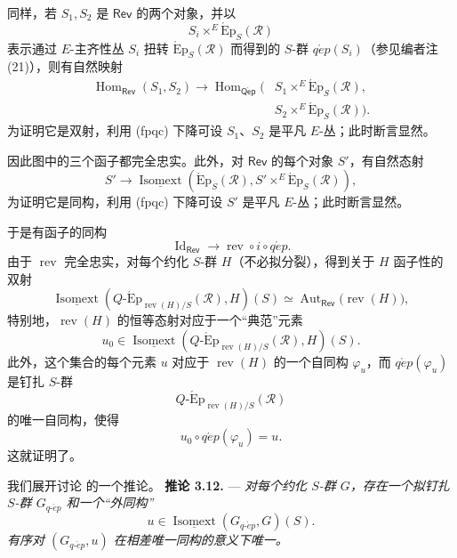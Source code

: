 同样，若 \(S_1,S_2\) 是 \(\mathsf{Rev}\) 的两个对象，并以
\[
  S_i\times^E\operatorname{\acute{E}p}_S(\mathscr R)
\]
表示通过 \(E\)-主齐性丛 \(S_i\) 扭转 \(\operatorname{\acute{E}p}_S(\mathscr R)\) 而得到的 \(S\)-群 \(q\acute{e}p(S_i)\)（参见编者注 (21)），则有自然映射
\[
\begin{aligned}
  \operatorname{Hom}_{\mathsf{Rev}}(S_1,S_2)
  \longrightarrow
  \operatorname{Hom}_{\mathsf{Q\acute{e}p}}\bigl(
    &S_1\times^E\operatorname{\acute{E}p}_S(\mathscr R),\\
    &S_2\times^E\operatorname{\acute{E}p}_S(\mathscr R)
  \bigr).
\end{aligned}
\]
为证明它是双射，利用 \textup{(fpqc)} 下降可设 \(S_1\)、\(S_2\) 是平凡 \(E\)-丛；此时断言显然。

因此图中的三个函子都完全忠实。此外，对 \(\mathsf{Rev}\) 的每个对象 \(S'\)，有自然态射
\[
  S'
  \longrightarrow
  \underline{\operatorname{Isomext}}\!\left(
    \operatorname{\acute{E}p}_S(\mathscr R),
    S'\times^E\operatorname{\acute{E}p}_S(\mathscr R)
  \right),
\]
为证明它是同构，利用 \textup{(fpqc)} 下降可设 \(S'\) 是平凡 \(E\)-丛；此时断言显然。

于是有函子的同构
\[
  \operatorname{Id}_{\mathsf{Rev}}
  \longrightarrow
  \operatorname{rev}\circ i\circ q\acute{e}p.
\]
由于 \(\operatorname{rev}\) 完全忠实，对每个约化 \(S\)-群 \(H\)（不必拟分裂），得到关于 \(H\) 函子性的双射
\[
  \underline{\operatorname{Isomext}}\!\left(
    Q\text{-}\operatorname{\acute{E}p}_{\operatorname{rev}(H)/S}
      (\mathscr R),
    H
  \right)(S)
  \simeq
  \operatorname{Aut}_{\mathsf{Rev}}\bigl(\operatorname{rev}(H)\bigr),
\]
特别地，\(\operatorname{rev}(H)\) 的恒等态射对应于一个“典范”元素
\[
  u_0\in
  \underline{\operatorname{Isomext}}\!\left(
    Q\text{-}\operatorname{\acute{E}p}_{\operatorname{rev}(H)/S}
      (\mathscr R),
    H
  \right)(S).
\]
此外，这个集合的每个元素 \(u\) 对应于 \(\operatorname{rev}(H)\) 的一个自同构 \(\varphi_u\)，而 \(q\acute{e}p(\varphi_u)\) 是钉扎 \(S\)-群
\[
  Q\text{-}\operatorname{\acute{E}p}_{\operatorname{rev}(H)/S}
    (\mathscr R)
\]
的唯一自同构，使得
\[
  u_0\circ q\acute{e}p(\varphi_u)=u.
\]
这就证明了。

我们展开讨论  的一个推论。
\medskip\noindent\textbf{推论 3.12.} ---
{\itshape 对每个约化 \(S\)-群 \(G\)，存在一个拟钉扎 \(S\)-群 \(G_{q\text{-}\acute{e}p}\) 和一个“外同构”}
\[
  u\in
  \underline{\operatorname{Isomext}}
    (G_{q\text{-}\acute{e}p},G)(S).
\]
{\itshape 有序对 \((G_{q\text{-}\acute{e}p},u)\) 在相差唯一同构的意义下唯一。}

